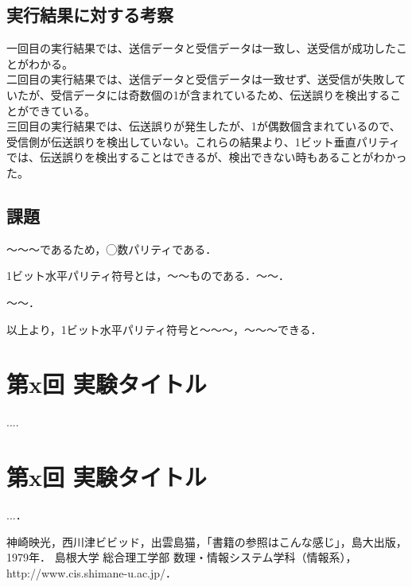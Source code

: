 \documentclass[a4j]{celb-report}
\begin{document}
\subsection{実行結果に対する考察}
一回目の実行結果では、送信データと受信データは一致し、送受信が成功したことがわかる。\\
二回目の実行結果では、送信データと受信データは一致せず、送受信が失敗していたが、受信データには奇数個の1が含まれているため、伝送誤りを検出することができている。\\
三回目の実行結果では、伝送誤りが発生したが、1が偶数個含まれているので、受信側が伝送誤りを検出していない。これらの結果より、1ビット垂直パリティでは、伝送誤りを検出することはできるが、検出できない時もあることがわかった。


\subsection{課題}


～～～であるため，◯数パリティである．


1ビット水平パリティ符号とは，～～ものである．～～．


～～．

以上より，1ビット水平パリティ符号と～～～，～～～できる．
%

\newpage
\section{第x回 実験タイトル}

....

\newpage
\section{第x回 実験タイトル}

...．

\newpage
\begin{thebibliography}{9}
 神崎映光，西川津ビビッド，出雲島猫，「書籍の参照はこんな感じ」，島大出版，1979年．
 島根大学 総合理工学部 数理・情報システム学科（情報系），http://www.cis.shimane-u.ac.jp/．
\end{thebibliography}
%
\end{document}

